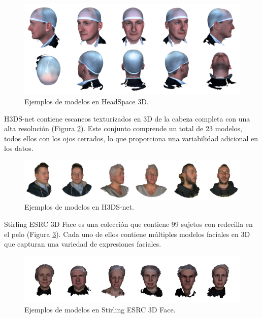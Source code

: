 \begin{figure}[H]
	\centering
	\includegraphics[scale=0.075]{imagenes/cap4/headspace.png}
	\caption[Ejemplos HeadSpace 3D.]{Ejemplos de modelos en HeadSpace 3D.}
	\label{fig17}
\end{figure}

H3DS-net \cite{61} contiene escaneos texturizados en 3D de la cabeza completa con una alta resolución (Figura \ref{fig18}). Este conjunto comprende un total de 23 modelos, todos ellos con los ojos cerrados, lo que proporciona una variabilidad adicional en los datos.

\begin{figure}[H]
	\centering
	\includegraphics[scale=0.18]{imagenes/cap4/h3dsnet.png}
	\caption[Ejemplos H3DS-net.]{Ejemplos de modelos en H3DS-net.}
	\label{fig18}
\end{figure}

Stirling ESRC 3D Face es una colección que contiene 99 sujetos con redecilla en el pelo (Figura \ref{fig18.1}). Cada uno de ellos contiene múltiples modelos faciales en 3D que capturan una variedad de expresiones faciales.

\begin{figure}[H]
	\centering
	\includegraphics[scale=0.85]{imagenes/cap4/stirling.png}
	\caption[Ejemplos Stirling ESRC 3D Face.]{Ejemplos de modelos en Stirling ESRC 3D Face.}
	\label{fig18.1}
\end{figure}

